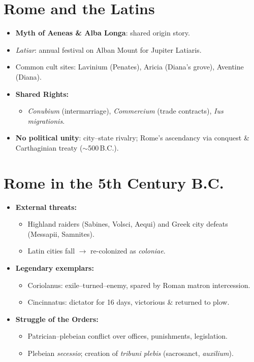 \documentclass[11pt,a4paper]{article}
\begin{document}
\section{Rome and the Latins}
\begin{itemize}
  \item \textbf{Myth of Aeneas \& Alba Longa}: shared origin story.
  \item \textit{Latiar}: annual festival on Alban Mount for Jupiter Latiaris.
  \item Common cult sites: Lavinium (Penates), Aricia (Diana’s grove), Aventine (Diana).
  \item \textbf{Shared Rights:}
    \begin{itemize}
      \item \textit{Conubium} (intermarriage), \textit{Commercium} (trade contracts), \textit{Ius migrationis}.
    \end{itemize}
  \item \textbf{No political unity}: city–state rivalry; Rome’s ascendancy via conquest \& Carthaginian treaty (\(\sim\)500\,B.C.).
\end{itemize}

\section{Rome in the 5th Century B.C.}
\begin{itemize}
  \item \textbf{External threats:}
    \begin{itemize}
      \item Highland raiders (Sabines, Volsci, Aequi) and Greek city defeats (Messapii, Samnites).
      \item Latin cities fall \(\to\) re-colonized as \textit{coloniae}.
    \end{itemize}
  \item \textbf{Legendary exemplars:}
    \begin{itemize}
      \item Coriolanus: exile–turned–enemy, spared by Roman matron intercession.
      \item Cincinnatus: dictator for 16 days, victorious \& returned to plow.
    \end{itemize}
  \item \textbf{Struggle of the Orders:}
    \begin{itemize}
      \item Patrician–plebeian conflict over offices, punishments, legislation.
      \item Plebeian \textit{secessio}; creation of \textit{tribuni plebis} (sacrosanct, \textit{auxilium}).
    \end{itemize}
\end{itemize}
\end{document}
